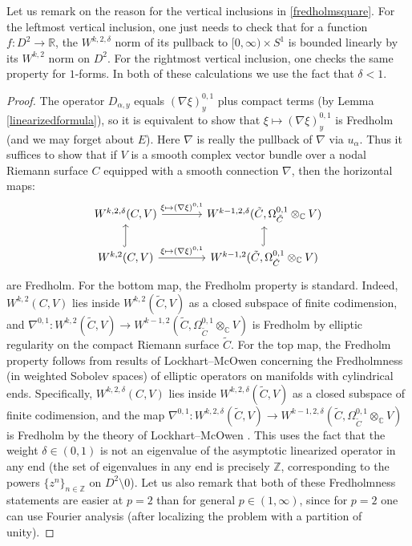 \documentclass[12pt]{article}
\theoremstyle{definition}
\theoremstyle{remark}
\numberwithin{equation}{subsection}
\newcommand{\CC}{\mathbb C}
\newcommand{\ZZ}{\mathbb Z}
\newcommand{\RR}{\mathbb R}
\begin{document}
Let us remark on the reason for the vertical inclusions in \eqref{fredholmsquare}.  For the leftmost vertical inclusion, one just needs to check that for a function $f:D^2\to\RR$, the $W^{k,2,\delta}$ norm of its pullback to $[0,\infty)\times S^1$ is bounded linearly by its $W^{k,2}$ norm on $D^2$.  For the rightmost vertical inclusion, one checks the same property for $1$-forms.  In both of these calculations we use the fact that $\delta<1$.

\begin{proof}
The operator $D_{\alpha,y}$ equals $(\nabla\xi)^{0,1}_y$ plus compact terms (by Lemma \ref{linearizedformula}), so it is equivalent to show that $\xi\mapsto(\nabla\xi)^{0,1}_y$ is Fredholm (and we may forget about $E$).  Here $\nabla$ is really the pullback of $\nabla$ via $u_\alpha$.  Thus it suffices to show that if $V$ is a smooth complex vector bundle over a nodal Riemann surface $C$ equipped with a smooth connection $\nabla$, then the horizontal maps:
\begin{equation}
\begin{tikzcd}[column sep = large]
W^{k,2,\delta}(C,V)\ar{r}{\xi\mapsto(\nabla\xi)^{0,1}}&W^{k-1,2,\delta}(\tilde C,\Omega^{0,1}_{\tilde C}\otimes_\CC V)\\
W^{k,2}(C,V)\ar[hook]{u}\ar{r}{\xi\mapsto(\nabla\xi)^{0,1}}&W^{k-1,2}(\tilde C,\Omega^{0,1}_{\tilde C}\otimes_\CC V)\ar[hook]{u}
\end{tikzcd}
\end{equation}
are Fredholm.  For the bottom map, the Fredholm property is standard.  Indeed, $W^{k,2}(C,V)$ lies inside $W^{k,2}(\tilde C,V)$ as a closed subspace of finite codimension, and $\nabla^{0,1}:W^{k,2}(\tilde C,V)\to W^{k-1,2}(\tilde C,\Omega^{0,1}_{\tilde C}\otimes_\CC V)$ is Fredholm by elliptic regularity on the compact Riemann surface $\tilde C$.  For the top map, the Fredholm property follows from results of Lockhart--McOwen \cite{lockhartmcowen} concerning the Fredholmness (in weighted Sobolev spaces) of elliptic operators on manifolds with cylindrical ends.  Specifically, $W^{k,2,\delta}(C,V)$ lies inside $W^{k,2,\delta}(\tilde C,V)$ as a closed subspace of finite codimension, and the map $\nabla^{0,1}:W^{k,2,\delta}(\tilde C,V)\to W^{k-1,2,\delta}(\tilde C,\Omega^{0,1}_{\tilde C}\otimes_\CC V)$ is Fredholm by the theory of Lockhart--McOwen \cite{lockhartmcowen}.  This uses the fact that the weight $\delta\in(0,1)$ is not an eigenvalue of the asymptotic linearized operator in any end (the set of eigenvalues in any end is precisely $\ZZ$, corresponding to the powers $\{z^n\}_{n\in\ZZ}$ on $D^2\setminus 0$).  Let us also remark that both of these Fredholmness statements are easier at $p=2$ than for general $p\in(1,\infty)$, since for $p=2$ one can use Fourier analysis (after localizing the problem with a partition of unity).


\end{proof}
\end{document}
